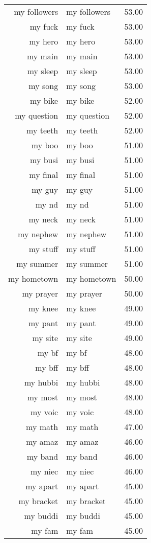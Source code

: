 \begin{table}[ht]
\begin{tabular}{rlr}
  my followers & my followers & 53.00 \\ 
  my fuck & my fuck & 53.00 \\ 
  my hero & my hero & 53.00 \\ 
  my main & my main & 53.00 \\ 
  my sleep & my sleep & 53.00 \\ 
  my song & my song & 53.00 \\ 
  my bike & my bike & 52.00 \\ 
  my question & my question & 52.00 \\ 
  my teeth & my teeth & 52.00 \\ 
  my boo & my boo & 51.00 \\ 
  my busi & my busi & 51.00 \\ 
  my final & my final & 51.00 \\ 
  my guy & my guy & 51.00 \\ 
  my nd & my nd & 51.00 \\ 
  my neck & my neck & 51.00 \\ 
  my nephew & my nephew & 51.00 \\ 
  my stuff & my stuff & 51.00 \\ 
  my summer & my summer & 51.00 \\ 
  my hometown & my hometown & 50.00 \\ 
  my prayer & my prayer & 50.00 \\ 
  my knee & my knee & 49.00 \\ 
  my pant & my pant & 49.00 \\ 
  my site & my site & 49.00 \\ 
  my bf & my bf & 48.00 \\ 
  my bff & my bff & 48.00 \\ 
  my hubbi & my hubbi & 48.00 \\ 
  my most & my most & 48.00 \\ 
  my voic & my voic & 48.00 \\ 
  my math & my math & 47.00 \\ 
  my amaz & my amaz & 46.00 \\ 
  my band & my band & 46.00 \\ 
  my niec & my niec & 46.00 \\ 
  my apart & my apart & 45.00 \\ 
  my bracket & my bracket & 45.00 \\ 
  my buddi & my buddi & 45.00 \\ 
  my fam & my fam & 45.00 \\ 

\end{tabular}
\end{table}

